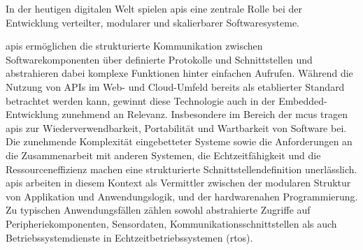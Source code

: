 In der heutigen digitalen Welt spielen \gls{apis} eine zentrale Rolle bei der Entwicklung verteilter, modularer und skalierbarer Softwaresysteme. 

\gls{apis} ermöglichen die strukturierte Kommunikation zwischen Softwarekomponenten über definierte Protokolle und Schnittstellen und abstrahieren dabei komplexe Funktionen hinter einfachen Aufrufen.
Während die Nutzung von APIs im Web- und Cloud-Umfeld bereits als etablierter Standard betrachtet werden kann, gewinnt diese Technologie auch in der Embedded-Entwicklung zunehmend an Relevanz.
Insbesondere im Bereich der \gls{mcus} tragen \gls{apis} zur Wiederverwendbarkeit, Portabilität und Wartbarkeit von Software bei.
Die zunehmende Komplexität eingebetteter Systeme sowie die Anforderungen an die Zusammenarbeit mit anderen Systemen, die Echtzeitfähigkeit und  die Ressourceneffizienz machen eine strukturierte Schnittstellendefinition unerlässlich.
\gls{apis} arbeiten in diesem Kontext als Vermittler zwischen der modularen Struktur von Applikation und Anwendungslogik, und der hardwarenahen Programmierung.
Zu typischen Anwendungsfällen zählen sowohl abstrahierte Zugriffe auf Peripheriekomponenten, Sensordaten, Kommunikationsschnittstellen als auch Betriebssystemdienste in Echtzeitbetriebssystemen (\gls{rtos}).